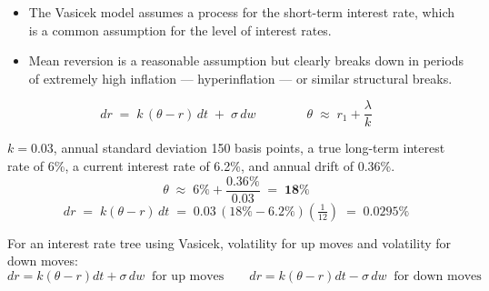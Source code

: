 
\begin{itemize}
\item The Vasicek model assumes a  process for the short-term interest rate,
      which is a common assumption for the level of interest rates.
\item Mean reversion is a reasonable assumption but clearly breaks down in periods of extremely
      high inflation --- hyperinflation --- or similar structural breaks.
\end{itemize}

\begin{mrfmlbox}
\[ dr \;=\; k\,(\theta - r)\,dt \;+\; \sigma\, dw
   \qquad\qquad
   \theta \;\approx\; r_1 + \frac{\lambda}{k} \]
\end{mrfmlbox}

\begin{mrexbox}[title={Example --- $dr$ under the Vasicek model}]
$k = 0.03$, annual standard deviation 150 basis points, a true long-term interest rate of 6\%, a
current interest rate of 6.2\%, and annual drift of 0.36\%.
\tcblower
\small
\[ \theta \;\approx\; 6\% + \frac{0.36\%}{0.03} \;=\; \mathbf{18\%} \]
\[ dr \;=\; k(\theta - r)\,dt \;=\; 0.03\,(18\% - 6.2\%)\left(\tfrac{1}{12}\right)
   \;=\; \mathbf{0.0295\%} \]
\end{mrexbox}

\begin{mrtrapbox}[title={Remember}]
For an interest rate tree using Vasicek,  volatility for up moves and 
volatility for down moves:
\[ dr = k(\theta - r)dt + \sigma\,dw \ \text{ for up moves}
   \qquad
   dr = k(\theta - r)dt - \sigma\,dw \ \text{ for down moves} \]
\end{mrtrapbox}

